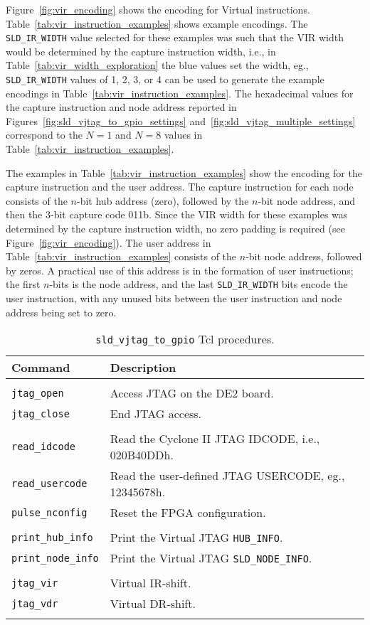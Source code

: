 \documentclass[10pt,twoside]{article}
\begin{document}
Figure~\ref{fig:vir_encoding} shows the encoding for Virtual 
instructions. Table~\ref{tab:vir_instruction_examples} shows
example encodings. The \verb+SLD_IR_WIDTH+ value selected for 
these examples was such that the VIR width would be determined
by the capture instruction width, i.e., in 
Table~\ref{tab:vir_width_exploration} the blue values set the width,
eg., \verb+SLD_IR_WIDTH+ values of 1, 2, 3, or 4
can be used to generate the example encodings in
Table~\ref{tab:vir_instruction_examples}.
The hexadecimal values for the capture instruction and 
node address reported in Figures~\ref{fig:sld_vjtag_to_gpio_settings} 
and~\ref{fig:sld_vjtag_multiple_settings} correspond to
the $N=1$ and $N=8$ values in Table~\ref{tab:vir_instruction_examples}.

The examples in Table~\ref{tab:vir_instruction_examples} show the 
encoding for the capture instruction and the user address.
The capture instruction for each node consists of 
the $n$-bit hub address (zero), followed by the $n$-bit node
address, and then the 3-bit capture code 011b. Since the
VIR width for these examples was determined by the capture
instruction width, no zero padding is required
(see Figure~\ref{fig:vir_encoding}). 
The user address in Table~\ref{tab:vir_instruction_examples} 
consists of the $n$-bit node address, followed by zeros. A practical
use of this address is in the formation of user instructions;
the first $n$-bits is the node address, and the last \verb+SLD_IR_WIDTH+
bits encode the user instruction, with any unused bits between
the user instruction and node address being set to zero.

\begin{table}[t]
\caption{{\tt sld\_vjtag\_to\_gpio} Tcl procedures.}
\label{tab:sld_vjtag_to_gpio_cmds}
\begin{center}
\begin{tabular}{|l|p{10cm}|}
\hline
Command & Description\\
\hline\hline
&\\
\verb+jtag_open+  & Access JTAG on the DE2 board.\\
\verb+jtag_close+ & End JTAG access.\\
&\\
\verb+read_idcode+   & Read the Cyclone II JTAG IDCODE, i.e., 020B40DDh.\\
\verb+read_usercode+ & Read the user-defined JTAG USERCODE, eg., 12345678h.\\
\verb+pulse_nconfig+ & Reset the FPGA configuration.\\
&\\
\verb+print_hub_info+  & Print the Virtual JTAG \verb+HUB_INFO+.\\
\verb+print_node_info+ & Print the Virtual JTAG \verb+SLD_NODE_INFO+.\\
&\\
\verb+jtag_vir+ & Virtual IR-shift.\\
\verb+jtag_vdr+ & Virtual DR-shift.\\
&\\
\hline
\end{tabular}
\end{center}
\end{table}
\end{document}

